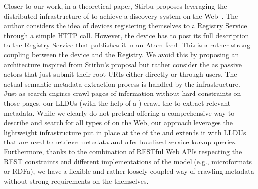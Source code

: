 Closer to our work, in a theoretical paper, Stirbu proposes leveraging the distributed infrastructure of \sts{} to achieve a discovery system on the Web~\cite{Stirbu2008}. The author considers the idea of devices registering themselves to a Registry Service through a simple HTTP  call. However, the device has to post its full description to the Registry Service that publishes it in an Atom feed. This is a rather strong coupling between the device and the Registry. We avoid this by proposing an architecture inspired from Stirbu's proposal but rather consider the \sts{} as passive actors that just submit their root URIs either directly or through users. The actual semantic metadata extraction process is handled by the infrastructure. Just as search engines crawl pages of information without hard constraints on those pages, our LLDUs (with the help of a \transService{}) crawl the \sts{} to extract relevant metadata.
                                                                                                                                                                                                                                                                                                                                                                                                                                                                                                                                                                                                                                                                                                                                                                                                                                                                                                                                While we clearly do not pretend offering a comprehensive way to describe and search for all types of \sts{} on the Web, our approach leverages the lightweight infrastructure put in place at the \devLayer{} of the \WoTA{} and extends it with LLDUs that are used to retrieve metadata and offer localized service lookup queries. Furthermore, thanks to the combination of RESTful Web APIs respecting the REST constraints and different implementations of the \stm{} model (e.g., microformats or RDFa\cite{Aguilar2010}), we have a flexible and rather loosely-coupled way of crawling metadata without strong requirements on the \sts{} themselves.


